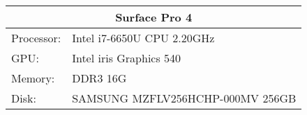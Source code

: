 \begin{table}[]
    \begin{tabular}{ll}
    \hline
    \multicolumn{2}{|c|}{Surface Pro 4}           \\ \hline
    Processor: & Intel i7-6650U CPU 2.20GHz       \\
    GPU:       & Intel iris Graphics 540          \\
    Memory:    & DDR3 16G                         \\
    Disk:      & SAMSUNG MZFLV256HCHP-000MV 256GB
    \end{tabular}
    \end{table} 